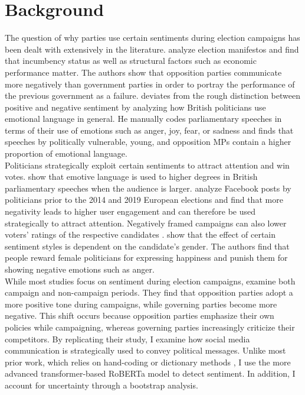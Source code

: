 \documentclass{article}
\begin{document}
\section{Background}
The question of why parties use certain sentiments during election campaigns has been dealt with extensively in the literature. \textcite{crabtree_it_2020} analyze election manifestos and find that incumbency status as well as structural factors such as economic performance matter. The authors show that opposition parties communicate more negatively than government parties in order to portray the performance of the previous government as a failure. \textcite{yildirim_emotions_2025} deviates from the rough distinction between positive and negative sentiment by analyzing how British politicians use emotional language in general. He manually codes parliamentary speeches in terms of their use of emotions such as anger, joy, fear, or sadness and finds that speeches by politically vulnerable, young, and opposition MPs contain a higher proportion of emotional language. \\
\noindent Politicians strategically exploit certain sentiments to attract attention and win votes. \textcite{osnabrugge_playing_2021} show that emotive language is used to higher degrees in British parliamentary speeches when the audience is larger. \textcite{klinger_are_2024} analyze Facebook posts by politicians prior to the 2014 and 2019 European elections and find that more negativity leads to higher user engagement and can therefore be used strategically to attract attention. Negatively framed campaigns can also lower voters' ratings of the respective candidates \parencite{krupnikov_accentuating_2015}. \textcite{boussalis_gender_2021} show that the effect of certain sentiment styles is dependent on the candidate's gender. The authors find that people reward female politicians for expressing happiness and punish them for showing negative emotions such as anger. \\
\noindent While most studies focus on sentiment during election campaigns, \textcite{castanho_silva_modulation_2024} examine both campaign and non-campaign periods. They find that opposition parties adopt a more positive tone during campaigns, while governing parties become more negative. This shift occurs because opposition parties emphasize their own policies while campaigning, whereas governing parties increasingly criticize their competitors. By replicating their study, I examine how social media communication is strategically used to convey political messages. Unlike most prior work, which relies on hand-coding \parencite{yildirim_emotions_2025} or dictionary methods \parencite{castanho_silva_modulation_2024}, I use the more advanced transformer-based RoBERTa model to detect sentiment. In addition, I account for uncertainty through a bootstrap analysis.
\end{document}
